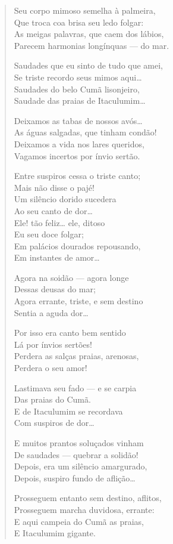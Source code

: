 \begin{verse}
Seu corpo mimoso semelha à palmeira,\\
Que troca coa brisa seu ledo folgar:\\
As meigas palavras, que caem dos lábios,\\
Parecem harmonias longínquas --- do mar.

Saudades que eu sinto de tudo que amei,\\
Se triste recordo seus mimos aqui\ldots{}\\
Saudades do belo Cumã lisonjeiro,\\
Saudade das praias de Itaculumim\ldots{}

Deixamos as tabas de nossos avós\ldots{}\\
As águas salgadas, que tinham condão!\\
Deixamos a vida nos lares queridos,\\
Vagamos incertos por ínvio sertão.

Entre suspiros cessa o triste canto;\\
Mais não disse o pajé!\\
Um silêncio dorido sucedera\\
Ao seu canto de dor\ldots{}\\
Ele! tão feliz\ldots{} ele, ditoso\\
Eu seu doce folgar;\\
Em palácios dourados repousando,\\
Em instantes de amor\ldots{}

Agora na soidão --- agora longe\\
Dessas deusas do mar;\\
Agora errante, triste, e sem destino\\
Sentia a aguda dor\ldots{}

Por isso era canto bem sentido\\
Lá por ínvios sertões!\\
Perdera as salças praias, arenosas,\\
Perdera o seu amor!

Lastimava seu fado --- e se carpia\\
Das praias do Cumã.\\
E de Itaculumim se recordava\\
Com suspiros de dor\ldots{}

E muitos prantos soluçados vinham\\
De saudades --- quebrar a solidão!\\
Depois, era um silêncio amargurado,\\
Depois, suspiro fundo de aflição\ldots{}

Prosseguem entanto sem destino, aflitos,\\
Prosseguem marcha duvidosa, errante:\\
E aqui campeia do Cumã as praias,\\
E Itaculumim gigante.
\end{verse}


